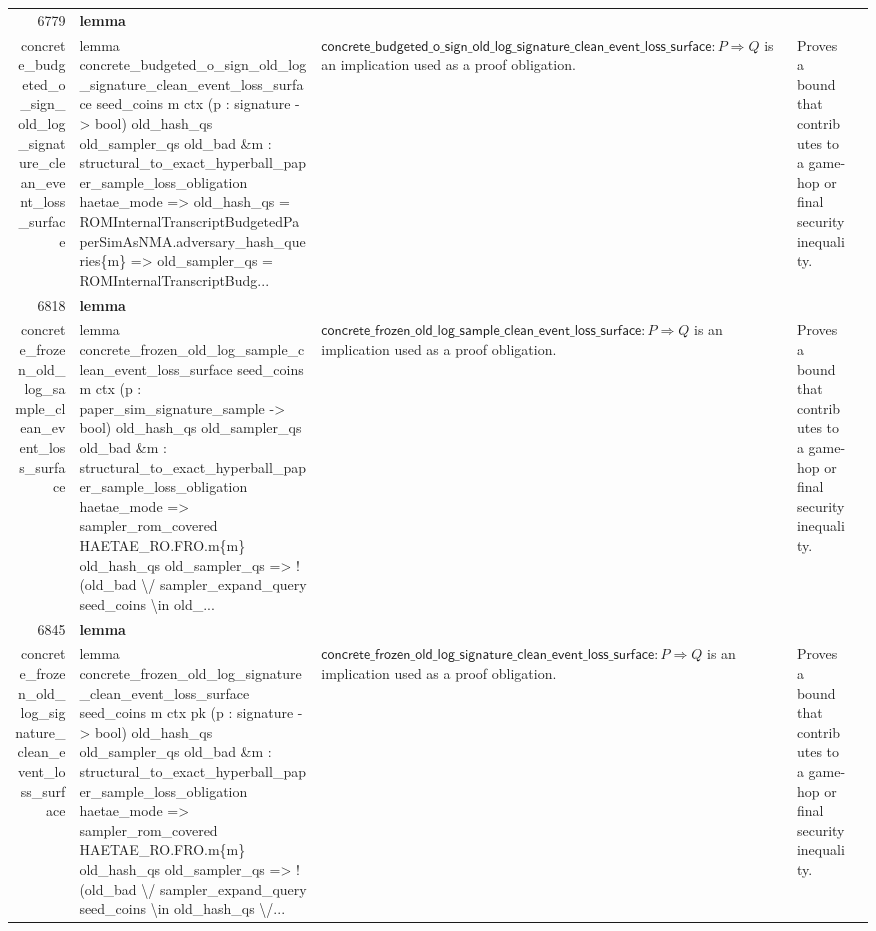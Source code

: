 \documentclass[10pt]{article}
\newcommand{\ec}[1]{\begingroup\ttfamily\scriptsize #1\endgroup}
\begin{document}
\begin{longtable}{r L{0.17\textwidth} L{0.26\textwidth} L{0.27\textwidth} L{0.20\textwidth}}
6779 & \textbf{lemma}\\\ec{concrete\_budgeted\_o\_sign\_old\_log\_signature\_clean\_event\_loss\_surface} & \ec{lemma concrete\_budgeted\_o\_sign\_old\_log\_signature\_clean\_event\_loss\_surface seed\_coins m ctx (p : signature -> bool) old\_hash\_qs old\_sampler\_qs old\_bad \&m : structural\_to\_exact\_hyperball\_paper\_sample\_loss\_obligation haetae\_mode => old\_hash\_qs = ROMInternalTranscriptBudgetedPaperSimAsNMA.adversary\_hash\_queries\{m\} => old\_sampler\_qs = ROMInternalTranscriptBudg...} & \(\mathsf{concrete\_budgeted\_o\_sign\_old\_log\_signature\_clean\_event\_loss\_surface} : P \Rightarrow Q\) is an implication used as a proof obligation. & Proves a bound that contributes to a game-hop or final security inequality. \\
6818 & \textbf{lemma}\\\ec{concrete\_frozen\_old\_log\_sample\_clean\_event\_loss\_surface} & \ec{lemma concrete\_frozen\_old\_log\_sample\_clean\_event\_loss\_surface seed\_coins m ctx (p : paper\_sim\_signature\_sample -> bool) old\_hash\_qs old\_sampler\_qs old\_bad \&m : structural\_to\_exact\_hyperball\_paper\_sample\_loss\_obligation haetae\_mode => sampler\_rom\_covered HAETAE\_RO.FRO.m\{m\} old\_hash\_qs old\_sampler\_qs => ! (old\_bad \textbackslash{}/ sampler\_expand\_query seed\_coins \textbackslash{}in old\_...} & \(\mathsf{concrete\_frozen\_old\_log\_sample\_clean\_event\_loss\_surface} : P \Rightarrow Q\) is an implication used as a proof obligation. & Proves a bound that contributes to a game-hop or final security inequality. \\
6845 & \textbf{lemma}\\\ec{concrete\_frozen\_old\_log\_signature\_clean\_event\_loss\_surface} & \ec{lemma concrete\_frozen\_old\_log\_signature\_clean\_event\_loss\_surface seed\_coins m ctx pk (p : signature -> bool) old\_hash\_qs old\_sampler\_qs old\_bad \&m : structural\_to\_exact\_hyperball\_paper\_sample\_loss\_obligation haetae\_mode => sampler\_rom\_covered HAETAE\_RO.FRO.m\{m\} old\_hash\_qs old\_sampler\_qs => ! (old\_bad \textbackslash{}/ sampler\_expand\_query seed\_coins \textbackslash{}in old\_hash\_qs \textbackslash{}/...} & \(\mathsf{concrete\_frozen\_old\_log\_signature\_clean\_event\_loss\_surface} : P \Rightarrow Q\) is an implication used as a proof obligation. & Proves a bound that contributes to a game-hop or final security inequality. \\

\end{longtable}
\end{document}
